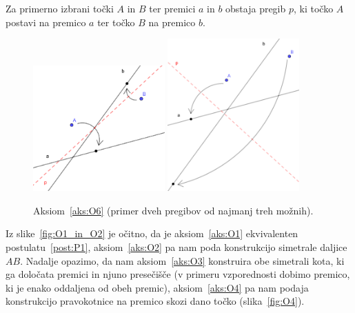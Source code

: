 \begin{aksiom}
    \label{aks:O6}
    Za primerno izbrani točki $A$ in $B$ ter premici $a$ in $b$ obstaja pregib $p$, ki točko $A$ postavi na premico $a$ ter točko $B$ na premico $b$.
\end{aksiom}

\begin{figure}[h!]
    \centering
    \includegraphics[width=0.45\textwidth]{images/origami_aksiomi/O6a.png}
    \includegraphics[width=0.45\textwidth]{images/origami_aksiomi/O6b.png}
    \caption[Aksiom~\ref{aks:O6}]{Aksiom~\ref{aks:O6} (primer dveh pregibov od najmanj treh možnih).}
    \label{fig:O6}
\end{figure}

\begin{aksiom}
    \label{aks:O7}

\end{aksiom}

Iz slike~\ref{fig:O1_in_O2} je očitno, da je aksiom~\ref{aks:O1} ekvivalenten postulatu~\ref{post:P1}, aksiom~\ref{aks:O2} pa nam poda konstrukcijo simetrale daljice $AB$. Nadalje opazimo, da nam aksiom~\ref{aks:O3} konstruira obe simetrali kota, ki ga določata premici in njuno presečišče (v primeru vzporednosti dobimo premico, ki je enako oddaljena od obeh premic), aksiom~\ref{aks:O4} pa nam podaja konstrukcijo pravokotnice na premico skozi dano točko (slika~\ref{fig:O4}).

